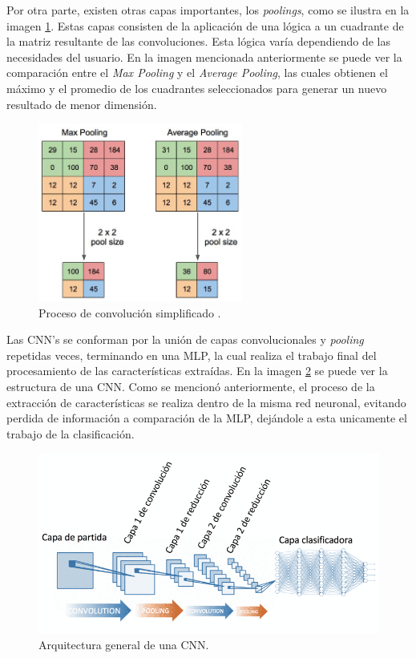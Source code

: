 Por otra parte, existen otras capas importantes, los \textit{poolings}, como se ilustra 
en la imagen \ref{pooling}. Estas capas consisten de la aplicación de una lógica a un 
cuadrante de la matriz resultante de las convoluciones. Esta lógica varía dependiendo 
de las necesidades del usuario. En la imagen mencionada anteriormente se puede ver la 
comparación entre el \textit{Max Pooling} y el \textit{Average Pooling}, las cuales 
obtienen el máximo y el promedio de los cuadrantes seleccionados para generar un nuevo 
resultado de menor dimensión. 

\begin{figure}[h!]
\includegraphics[width=0.6\textwidth]{images/pooling.png}
\centering
\caption{Proceso de convolución simplificado \protect\cite{pooling}.}
\label{pooling}
\end{figure}

Las CNN's se conforman por la unión de capas convolucionales y \textit{pooling} repetidas 
veces, terminando en una MLP, la cual realiza el trabajo final del procesamiento de las 
características extraídas. En la imagen \ref{CNN} se puede ver la estructura de una CNN. 
Como se mencionó anteriormente, el proceso de la extracción de características se realiza 
dentro de la misma red neuronal, evitando perdida de información a comparación de la MLP, 
dejándole a esta unicamente el trabajo de la clasificación.

\begin{figure}[h!]
\includegraphics[width=1\textwidth]{images/CNN.png}
\centering
\caption {Arquitectura general de una CNN\protect\cite{CNN-Arquitectura}. }
\label{CNN}
\end{figure}



